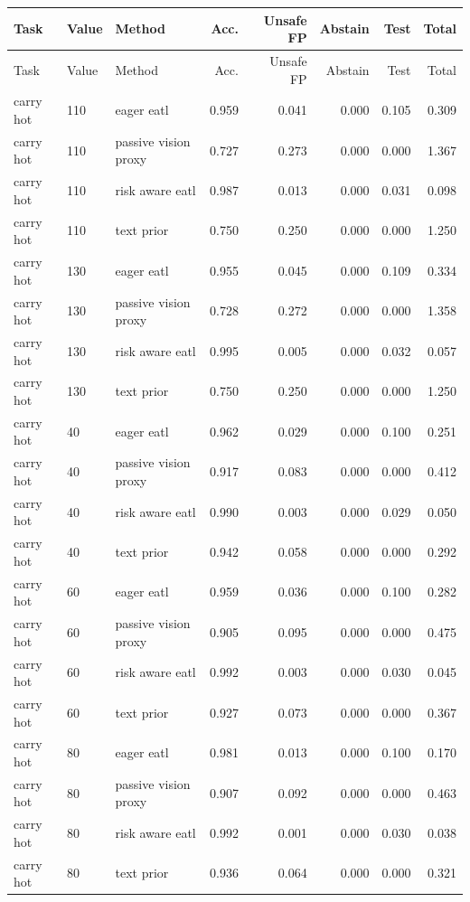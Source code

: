 \begin{longtable}{lllrrrrr}
\toprule
Task & Value & Method & Acc. & Unsafe FP & Abstain & Test & Total \\
\midrule
\endfirsthead
\toprule
Task & Value & Method & Acc. & Unsafe FP & Abstain & Test & Total \\
\midrule
\endhead
carry hot & 110 & eager eatl & 0.959 & 0.041 & 0.000 & 0.105 & 0.309 \\
carry hot & 110 & passive vision proxy & 0.727 & 0.273 & 0.000 & 0.000 & 1.367 \\
carry hot & 110 & risk aware eatl & 0.987 & 0.013 & 0.000 & 0.031 & 0.098 \\
carry hot & 110 & text prior & 0.750 & 0.250 & 0.000 & 0.000 & 1.250 \\
carry hot & 130 & eager eatl & 0.955 & 0.045 & 0.000 & 0.109 & 0.334 \\
carry hot & 130 & passive vision proxy & 0.728 & 0.272 & 0.000 & 0.000 & 1.358 \\
carry hot & 130 & risk aware eatl & 0.995 & 0.005 & 0.000 & 0.032 & 0.057 \\
carry hot & 130 & text prior & 0.750 & 0.250 & 0.000 & 0.000 & 1.250 \\
carry hot & 40 & eager eatl & 0.962 & 0.029 & 0.000 & 0.100 & 0.251 \\
carry hot & 40 & passive vision proxy & 0.917 & 0.083 & 0.000 & 0.000 & 0.412 \\
carry hot & 40 & risk aware eatl & 0.990 & 0.003 & 0.000 & 0.029 & 0.050 \\
carry hot & 40 & text prior & 0.942 & 0.058 & 0.000 & 0.000 & 0.292 \\
carry hot & 60 & eager eatl & 0.959 & 0.036 & 0.000 & 0.100 & 0.282 \\
carry hot & 60 & passive vision proxy & 0.905 & 0.095 & 0.000 & 0.000 & 0.475 \\
carry hot & 60 & risk aware eatl & 0.992 & 0.003 & 0.000 & 0.030 & 0.045 \\
carry hot & 60 & text prior & 0.927 & 0.073 & 0.000 & 0.000 & 0.367 \\
carry hot & 80 & eager eatl & 0.981 & 0.013 & 0.000 & 0.100 & 0.170 \\
carry hot & 80 & passive vision proxy & 0.907 & 0.092 & 0.000 & 0.000 & 0.463 \\
carry hot & 80 & risk aware eatl & 0.992 & 0.001 & 0.000 & 0.030 & 0.038 \\
carry hot & 80 & text prior & 0.936 & 0.064 & 0.000 & 0.000 & 0.321 \\

\end{longtable}
